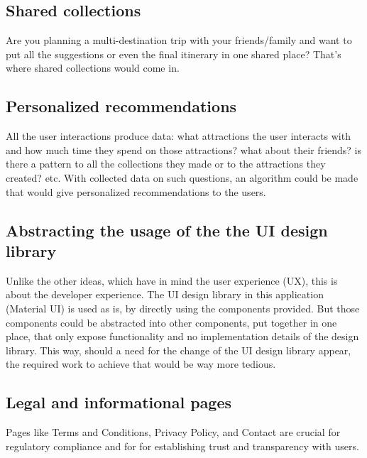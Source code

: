 \subsection{Shared collections}

\par Are you planning a multi-destination trip with your friends/family and want to put all the suggestions or even the final itinerary in one shared place? That's where shared collections would come in.

\subsection{Personalized recommendations}
\par All the user interactions produce data: what attractions the user interacts with and how much time they spend on those attractions? what about their friends? is there a pattern to all the collections they made or to the attractions they created? etc. With collected data on such questions, an algorithm could be made that would give personalized recommendations to the users. 

\subsection{Abstracting the usage of the the UI design library}
\par Unlike the other ideas, which have in mind the user experience (UX), this is about the developer experience. The UI design library in this application (Material UI) is used as is, by directly using the components provided. But those components could be abstracted into other components, put together in one place, that only expose functionality and no implementation details of the design library. This way, should a need for the change of the UI design library appear, the required work to achieve that would be way more tedious.


\subsection{Legal and informational pages}
 \par Pages like Terms and Conditions, Privacy Policy, and Contact are crucial for regulatory compliance and for for establishing trust and transparency with users.
